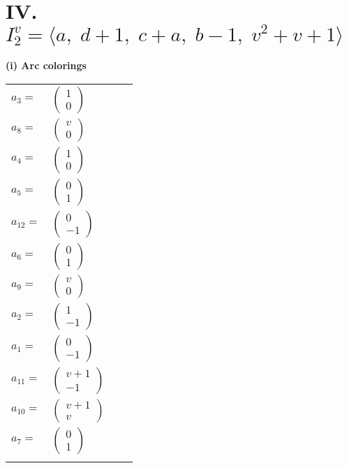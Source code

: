 \documentclass[1p]{elsarticle_modified}
\theoremstyle{definition}
\begin{document}
\centering \section*{IV. $I^v_{2}= \langle a,\;d+1,\;c+a,\;b-1,\;v^2+v+1 \rangle$}
\flushleft \textbf{(i) Arc colorings}\\
\begin{tabular}{m{7pt} m{180pt} m{7pt} m{180pt} }
\flushright $a_{3}=$&$\begin{pmatrix}1\\0\end{pmatrix}$ \\
\flushright $a_{8}=$&$\begin{pmatrix}v\\0\end{pmatrix}$ \\
\flushright $a_{4}=$&$\begin{pmatrix}1\\0\end{pmatrix}$ \\
\flushright $a_{5}=$&$\begin{pmatrix}0\\1\end{pmatrix}$ \\
\flushright $a_{12}=$&$\begin{pmatrix}0\\-1\end{pmatrix}$ \\
\flushright $a_{6}=$&$\begin{pmatrix}0\\1\end{pmatrix}$ \\
\flushright $a_{9}=$&$\begin{pmatrix}v\\0\end{pmatrix}$ \\
\flushright $a_{2}=$&$\begin{pmatrix}1\\-1\end{pmatrix}$ \\
\flushright $a_{1}=$&$\begin{pmatrix}0\\-1\end{pmatrix}$ \\
\flushright $a_{11}=$&$\begin{pmatrix}v+1\\-1\end{pmatrix}$ \\
\flushright $a_{10}=$&$\begin{pmatrix}v+1\\v\end{pmatrix}$ \\
\flushright $a_{7}=$&$\begin{pmatrix}0\\1\end{pmatrix}$\\&\end{tabular}
\end{document}
